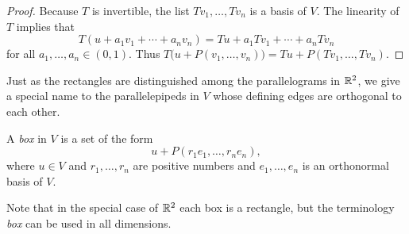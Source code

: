 \begin{proof}
Because $T$ is invertible, the list $Tv_1,\dots,Tv_n$ is a basis of $V$. The
linearity of $T$ implies that
\[ T(u+a_1v_1+\cdots+a_nv_n) = Tu+a_1Tv_1+\cdots+a_nTv_n \]
for all $a_1,\dots,a_n\in(0,1)$. Thus
$T\bigl(u+P(v_1,\dots,v_n)\bigr)=Tu+P(Tv_1,\dots,Tv_n)$.
\end{proof}

Just as the rectangles are distinguished among the parallelograms in $\mathbb{R}^2$, we
give a special name to the parallelepipeds in $V$ whose defining edges are
orthogonal to each other.

\begin{definition}[Box]\label{ax:7.105}
A \emph{box} in $V$ is a set of the form
\[ u+P(r_1e_1,\dots,r_ne_n), \]
where $u\in V$ and $r_1,\dots,r_n$ are positive numbers and $e_1,\dots,e_n$ is
an orthonormal basis of $V$.
\end{definition}

Note that in the special case of $\mathbb{R}^2$ each box is a rectangle, but the
terminology \emph{box} can be used in all dimensions.

